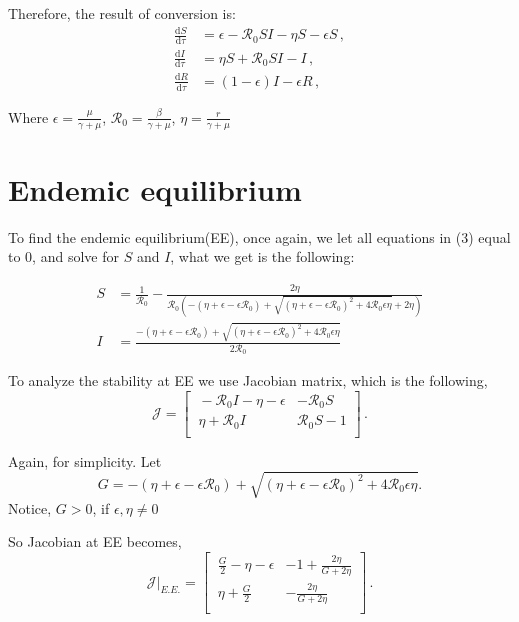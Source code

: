 \documentclass[12pt]{article}
\newcommand\dbyd[2]{\frac{\mathrm d{#1}}{\mathrm d{#2}}}
\newcommand{\R}{\mathcal{R}}
\begin{document}
Therefore, the result of conversion is:
\begin{equation}
\begin{split}
\dbyd{S}{\tau}&=\epsilon- \R_0  SI-\eta S-\epsilon S\,, \\
\dbyd{I}{\tau}&=\eta S+\R_0 SI-I\,,\\
\dbyd{R}{\tau}&=(1-\epsilon)I-\epsilon R\,,
\end{split}
\end{equation}

Where $\epsilon=\frac{\mu}{\gamma+\mu}$, $\R_0=\frac{\beta}{\gamma+\mu}$, $\eta=\frac{r}{\gamma+\mu}$

\section{Endemic equilibrium}
To find the endemic equilibrium(EE), once again, we let all equations in (3) equal to 0, and solve for $S$ and $I$, what we get is the following:

\begin{align}
S &= \frac{1}{\R_0}-\frac{2\eta}{\R_0(-(\eta+\epsilon-\epsilon\R_0)+\sqrt{(\eta+\epsilon-\epsilon\R_0)^2+4\R_0\epsilon \eta}+2\eta)}\\
I &= \frac{-(\eta+\epsilon-\epsilon\R_0)+\sqrt{(\eta+\epsilon-\epsilon\R_0)^2+4\R_0\epsilon \eta}}{2\R_0}
\end{align}

To analyze the stability at EE we use Jacobian matrix, which is the following,
\begin{equation}
\mathcal{J} =
\begin{bmatrix}
    \ -\R_0 I-\eta-\epsilon       & -\R_0 S \\
    \ \eta+\R_0 I       & \R_0 S-1 \\
\end{bmatrix}\,.
\end{equation}

Again, for simplicity. Let 
\begin{equation}
G=-(\eta+\epsilon-\epsilon\R_0)+\sqrt{(\eta+\epsilon-\epsilon\R_0)^2+4\R_0\epsilon \eta}.
\end{equation}
Notice, $G>0$, if $\epsilon,\eta\neq 0$

So Jacobian at EE becomes,
\begin{equation}
\mathcal{J}|_{E.E.}=
\begin{bmatrix}
    \ \frac{G}{2}-\eta-\epsilon       & -1+\frac{2\eta}{G+2\eta} \\
    \ \eta+\frac{G}{2}       & -\frac{2\eta}{G+2\eta} \\
\end{bmatrix}\,.
\end{equation}
\end{document}
